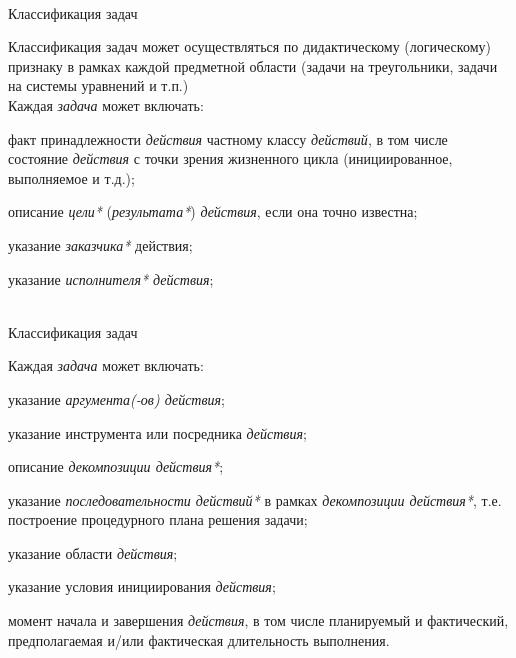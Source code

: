 \begin{frame}{\\Классификация задач}
	\topline
	\justifying
 
    Классификация задач может осуществляться по дидактическому (логическому) признаку в рамках каждой предметной области (задачи на треугольники, задачи на системы уравнений и т.п.)\\
    \bigskip
    Каждая \textit{задача} может включать:
    \begin{textitemize}
        \item факт принадлежности \textit{действия} частному классу \textit{действий}, в том числе состояние \textit{действия} с точки зрения жизненного цикла (инициированное, выполняемое и т.д.);
        \item описание \textit{цели*} (\textit{результата*}) \textit{действия}, если она точно известна;
        \item указание \textit{заказчика*} действия;
        \item указание \textit{исполнителя* действия};
    \end{textitemize}
\end{frame}

\begin{frame}{\\Классификация задач}
	\topline
	\justifying
    
    \bigskip
    Каждая \textit{задача} может включать:
    \begin{textitemize}
        \item указание \textit{аргумента(-ов) действия\scnrolesign};
        \item указание инструмента или посредника \textit{действия};
        \item описание \textit{декомпозиции действия*};
        \item указание \textit{последовательности действий*} в рамках \textit{декомпозиции действия*}, т.е. построение процедурного плана решения задачи;
        \item указание области \textit{действия};
        \item указание условия инициирования \textit{действия};
        \item момент начала и завершения \textit{действия}, в том числе планируемый и фактический, предполагаемая и/или фактическая длительность выполнения.
    \end{textitemize}
\end{frame}

